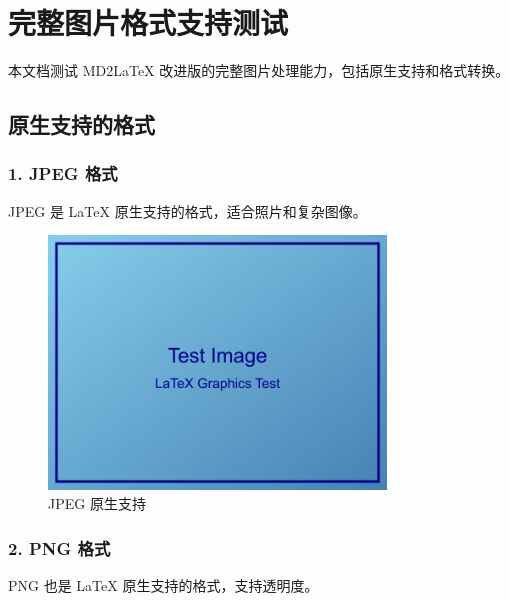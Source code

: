 \documentclass[UTF8, a4paper, 12pt]{ctexart}
\begin{document}
\section{完整图片格式支持测试}


本文档测试 MD2LaTeX 改进版的完整图片处理能力，包括原生支持和格式转换。


\subsection{原生支持的格式}


\subsubsection{1. JPEG 格式}

JPEG 是 LaTeX 原生支持的格式，适合照片和复杂图像。


\begin{figure}[H]
    \centering
    \includegraphics[width=0.8\textwidth]{../../tests/images/test_image.jpg}
    \caption{JPEG 原生支持}
    \label{fig:jpeg_____}
\end{figure}



\subsubsection{2. PNG 格式}

PNG 也是 LaTeX 原生支持的格式，支持透明度。
\end{document}
